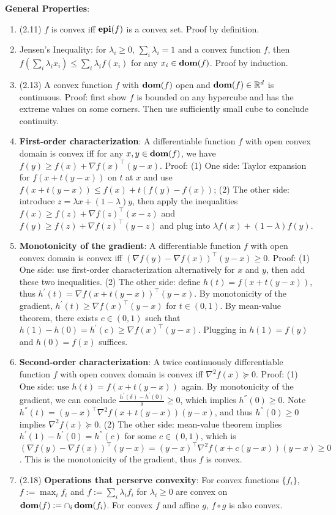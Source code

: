 \textbf{General Properties}:
\begin{enumerate}
    \item (2.11) $f$ is convex iff $\operatorname{\textbf{epi}}(f)$ is a convex set. Proof by definition.
    \item Jensen's Inequality: for $\lambda_i \ge 0$, $\sum_i \lambda_i = 1$ and a convex function $f$, then $f(\sum_i \lambda_i x_i) \le \sum_i \lambda_i f(x_i)$ for any $x_i \in \operatorname{\textbf{dom}}(f)$. Proof by induction.
    \item (2.13) A convex function $f$ with $\operatorname{\textbf{dom}}(f)$ open and $\operatorname{\textbf{dom}}(f) \in \mathbb{R}^d$ is continuous. Proof: first show $f$ is bounded on any hypercube and has the extreme values on some corners. Then use sufficiently small cube to conclude continuity.
    \item \textbf{First-order characterization}: A differentiable function $f$ with open convex domain is convex iff for any $x,y\in \operatorname{\textbf{dom}}(f)$, we have $f(y) \ge f(x) + \nabla f(x)^\top (y-x)$. Proof: (1) One side: Taylor expansion for $f(x+t(y-x))$ on $t$ at $x$ and use $f(x+t(y-x))\le f(x) + t(f(y)-f(x))$; (2) The other side: introduce $z = \lambda x + (1-\lambda) y$, then apply the inequalities $f(x) \ge f(z) + \nabla f(z)^\top (x-z)$ and $f(y) \ge f(z) + \nabla f(z)^\top (y-z)$ and plug into $\lambda f(x) + (1-\lambda)f(y)$.
    \item \textbf{Monotonicity of the gradient}: A differentiable function $f$ with open convex domain is convex iff $(\nabla f(y) - \nabla f(x))^\top (y-x) \ge 0$. Proof: (1) One side: use first-order characterization alternatively for $x$ and $y$, then add these two inequalities. (2) The other side: define $h(t) = f(x+t(y-x))$, thus $h^\prime(t) = \nabla f(x+t(y-x))^\top (y-x)$. By monotonicity of the gradient, $h^\prime(t) \ge \nabla f(x)^\top (y-x)$ for $t \in (0,1)$. By mean-value theorem, there exists $c \in (0,1)$ such that $h(1)-h(0)=h^\prime(c) \ge \nabla f(x)^\top (y-x)$. Plugging in $h(1)=f(y)$ and $h(0)=f(x)$ suffices.
    \item \textbf{Second-order characterization}: A twice continuously differentiable function $f$ with open convex domain is convex iff $\nabla^2 f(x) \succeq 0$. Proof: (1) One side: use $h(t) = f(x+t(y-x))$ again. By monotonicity of the gradient, we can conclude $\frac{h^\prime(\delta) - h^\prime(0)}{\delta} \ge 0$, which implies $h^{\dprime}(0) \ge 0$. Note $h^{\dprime}(t) = (y-x)^\top \nabla^2 f(x+t(y-x)) (y-x)$, and thus $h^{\dprime} (0) \ge 0$ implies $\nabla^2 f(x) \succeq 0$. (2) The other side: mean-value theorem implies $h^\prime(1) - h^\prime(0) = h^{\dprime}(c)$ for some $c \in (0,1)$, which is $(\nabla f(y) - \nabla f(x))^\top (y-x) = (y-x)^\top \nabla^2 f(x+c(y-x)) (y-x) \ge 0$. This is the monotonicity of the gradient, thus $f$ is convex.
    \item (2.18) \textbf{Operations that perserve convexity}: For convex functions $\{f_i\}$, $f:=\max_i f_i$ and $f:=\sum_i  \lambda_i f_i$ for $\lambda_i \ge 0$ are convex on $\operatorname{\textbf{dom}}(f):=\cap_i \operatorname{\textbf{dom}}(f_i)$. For convex $f$ and affine $g$, $f \circ g$ is also convex.
\end{enumerate}


